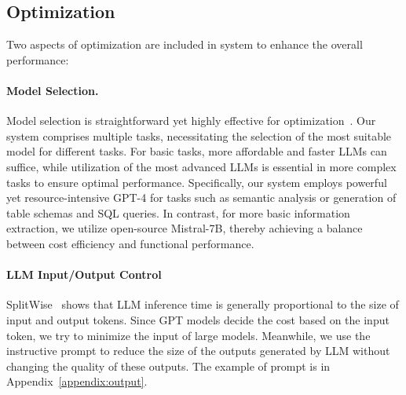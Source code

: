 \subsection{Optimization} 
Two aspects of optimization are included in \ben system to enhance the overall performance:


\paragraph{Model Selection.} \label{sec:model_selection} 
Model selection is straightforward yet highly effective for optimization~\citep{liu2024declarative}. Our system comprises multiple tasks, necessitating the selection of the most suitable model for different tasks. For basic tasks, more affordable and faster LLMs can suffice, while utilization of the most advanced LLMs is essential in more complex tasks to ensure optimal performance. Specifically, our system employs powerful yet resource-intensive GPT-4 for tasks such as semantic analysis or generation of table schemas and SQL queries. In contrast, for more basic information extraction, we utilize open-source Mistral-7B, thereby achieving a balance between cost efficiency and functional performance.

\paragraph{LLM Input/Output Control} SplitWise~\citep{patel2023splitwise} shows that LLM inference time is generally proportional to the size of input and output tokens. Since GPT models decide the cost based on the input token, we try to minimize the input of large models. Meanwhile, we use the instructive prompt to reduce the size of the outputs generated by LLM without changing the quality of these outputs. The example of prompt is in Appendix~\ref{appendix:output}.

